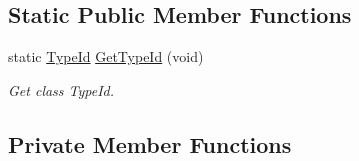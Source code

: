 \subsection*{Static Public Member Functions}
\begin{DoxyCompactItemize}
\item 
static \hyperlink{classns3_1_1TypeId}{Type\+Id} \hyperlink{classRoutingHelper_a8f5304766002e1f2fbf902c6b305b047}{Get\+Type\+Id} (void)
\begin{DoxyCompactList}\small\item\em Get class Type\+Id. \end{DoxyCompactList}\end{DoxyCompactItemize}
\subsection*{Private Member Functions}
